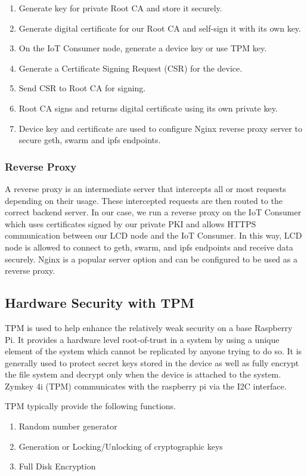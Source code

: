 \documentclass[11pt,openright]{report}
\begin{document}
\begin{enumerate}
	\item Generate key for private Root CA and store it securely.
	\item Generate digital certificate for our Root CA and self-sign it with its own key.
	\item On the IoT Consumer node, generate a device key or use TPM key.
	\item Generate a Certificate Signing Request (CSR) for the device.
	\item Send CSR to Root CA for signing.
	\item Root CA signs and returns digital certificate using its own private key.
	\item Device key and certificate are used to configure Nginx reverse proxy server to secure geth, swarm and ipfs endpoints.
\end{enumerate}

\subsubsection{Reverse Proxy}
A reverse proxy is an intermediate server that intercepts all or most requests depending on their usage. These intercepted requests are then routed to the correct backend server. In our case, we run a reverse proxy on the IoT Consumer which uses certificates signed by our private PKI and allows HTTPS communication between our LCD node and the IoT Consumer. In this way, LCD node is allowed to connect to geth, swarm, and ipfs endpoints and receive data securely. Nginx is a popular server option and can be configured to be used as a reverse proxy.

\subsection{Hardware Security with TPM}
TPM is used to help enhance the relatively weak security on a base Raspberry Pi. It provides a hardware level root-of-trust in a system by using a unique element of the system which cannot be replicated by anyone trying to do so. It is generally used to protect secret keys stored in the device as well as fully encrypt the file system and decrypt only when the device is attached to the system. Zymkey 4i (TPM) communicates with the raspberry pi via the I2C interface.

TPM typically provide the following functions.
\begin{enumerate}
	\item Random number generator
	\item Generation or Locking/Unlocking of cryptographic keys
	\item Full Disk Encryption
\end{enumerate}
\end{document}
